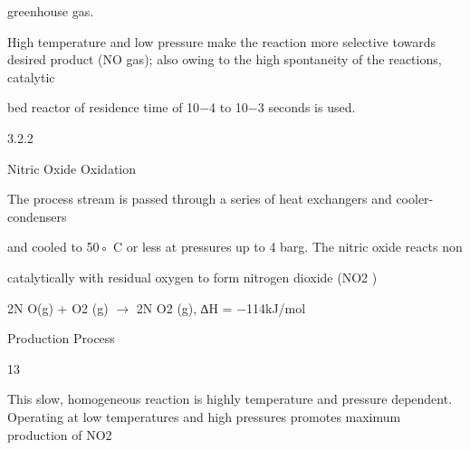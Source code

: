 \documentclass[a4paper,portrait,12pt]{article}
\begin{document}
\begin{flushleft}
greenhouse gas.
\end{flushleft}


\begin{flushleft}
High temperature and low pressure make the reaction more selective towards desired product (NO gas); also owing to the high spontaneity of the reactions, catalytic
\end{flushleft}


\begin{flushleft}
bed reactor of residence time of 10$-$4 to 10$-$3 seconds is used.
\end{flushleft}





3.2.2





\begin{flushleft}
Nitric Oxide Oxidation
\end{flushleft}





\begin{flushleft}
The process stream is passed through a series of heat exchangers and cooler-condensers
\end{flushleft}


\begin{flushleft}
and cooled to 50◦ C or less at pressures up to 4 barg. The nitric oxide reacts non
\end{flushleft}


\begin{flushleft}
catalytically with residual oxygen to form nitrogen dioxide (NO2 )
\end{flushleft}


\begin{flushleft}
2N O(g) + O2 (g) $\rightarrow$ 2N O2 (g), ∆H = $-$114kJ/mol
\end{flushleft}





\begin{flushleft}
\newpage
Production Process
\end{flushleft}





13





\begin{flushleft}
This slow, homogeneous reaction is highly temperature and pressure dependent. Operating at low temperatures and high pressures promotes maximum production of NO2
\end{flushleft}
\end{document}
